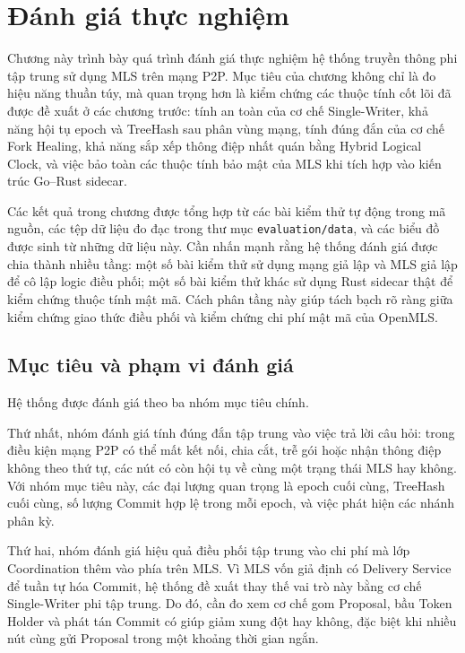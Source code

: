 \documentclass[../DoAn.tex]{subfiles}
\begin{document}
	
	\chapter{Đánh giá thực nghiệm}
	\label{ch:danh_gia_thuc_nghiem}
	
	Chương này trình bày quá trình đánh giá thực nghiệm hệ thống truyền thông phi tập trung sử dụng MLS trên mạng P2P. Mục tiêu của chương không chỉ là đo hiệu năng thuần túy, mà quan trọng hơn là kiểm chứng các thuộc tính cốt lõi đã được đề xuất ở các chương trước: tính an toàn của cơ chế Single-Writer, khả năng hội tụ epoch và TreeHash sau phân vùng mạng, tính đúng đắn của cơ chế Fork Healing, khả năng sắp xếp thông điệp nhất quán bằng Hybrid Logical Clock, và việc bảo toàn các thuộc tính bảo mật của MLS khi tích hợp vào kiến trúc Go--Rust sidecar.
	
	Các kết quả trong chương được tổng hợp từ các bài kiểm thử tự động trong mã nguồn, các tệp dữ liệu đo đạc trong thư mục \texttt{evaluation/data}, và các biểu đồ được sinh từ những dữ liệu này. Cần nhấn mạnh rằng hệ thống đánh giá được chia thành nhiều tầng: một số bài kiểm thử sử dụng mạng giả lập và MLS giả lập để cô lập logic điều phối; một số bài kiểm thử khác sử dụng Rust sidecar thật để kiểm chứng thuộc tính mật mã. Cách phân tầng này giúp tách bạch rõ ràng giữa kiểm chứng giao thức điều phối và kiểm chứng chi phí mật mã của OpenMLS.
	
	\section{Mục tiêu và phạm vi đánh giá}
	\label{sec:muc_tieu_danh_gia}
	
	Hệ thống được đánh giá theo ba nhóm mục tiêu chính.
	
	Thứ nhất, nhóm đánh giá tính đúng đắn tập trung vào việc trả lời câu hỏi: trong điều kiện mạng P2P có thể mất kết nối, chia cắt, trễ gói hoặc nhận thông điệp không theo thứ tự, các nút có còn hội tụ về cùng một trạng thái MLS hay không. Với nhóm mục tiêu này, các đại lượng quan trọng là epoch cuối cùng, TreeHash cuối cùng, số lượng Commit hợp lệ trong mỗi epoch, và việc phát hiện các nhánh phân kỳ.
	
	Thứ hai, nhóm đánh giá hiệu quả điều phối tập trung vào chi phí mà lớp Coordination thêm vào phía trên MLS. Vì MLS vốn giả định có Delivery Service để tuần tự hóa Commit, hệ thống đề xuất thay thế vai trò này bằng cơ chế Single-Writer phi tập trung. Do đó, cần đo xem cơ chế gom Proposal, bầu Token Holder và phát tán Commit có giúp giảm xung đột hay không, đặc biệt khi nhiều nút cùng gửi Proposal trong một khoảng thời gian ngắn.
	
\end{document}
